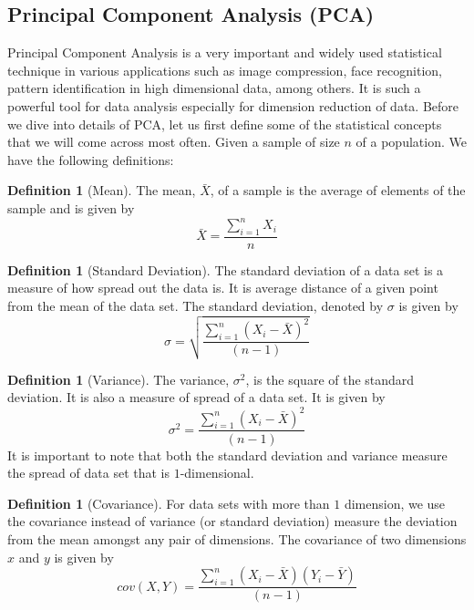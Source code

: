 \documentclass[10pt,a4paper]{article}
\theoremstyle{plain}
\theoremstyle{definition}
\newtheorem{defn}[subsection]{Definition}
\begin{document}
     \subsection{Principal Component Analysis (PCA)}
	  Principal Component Analysis is a very important and widely used statistical technique in various applications such as image compression, face recognition, pattern identification in high dimensional data, among others. It is such a powerful tool for data analysis especially for dimension reduction of data. Before we dive into details of PCA, let us first define some of the statistical concepts that we will come across most often. Given a sample of size $n$ of a population. We have the following definitions:
	  
	  \begin{defn}[Mean]
	  	The mean, $\bar{X}$, of a sample is the average of elements of the sample and is given by
	  	\begin{equation}
	  	\bar{X} = \frac{\sum_{i=1}^{n} X_i}{n}
	  	\end{equation}
	  \end{defn}
    
      \begin{defn}[Standard Deviation]
      	The standard deviation of a data set is a measure of how spread out the data is. It is average distance of a given point from the mean of the data set. The standard deviation, denoted by $\sigma$ is given by
      	\begin{equation}
      	\sigma = \sqrt{\frac{\sum_{i=1}^{n} (X_i - \bar{X})^2}{(n-1)}}
      	\end{equation}
      \end{defn}
  
      \begin{defn}[Variance]
      	The variance, $\sigma^2$, is the square of the standard deviation. It is also a measure of spread of a data set. It is given by
      	\begin{equation}
      	\sigma^2 =  \frac{\sum_{i=1}^{n} (X_i - \bar{X})^2}{(n-1)}
      	\end{equation}
      	It is important to note that both the standard deviation and variance measure the spread of data set that is $1$-dimensional. 
      \end{defn}
  
      \begin{defn}[Covariance]
      	For data sets with more than $1$ dimension, we use the covariance instead of variance (or standard deviation) measure the deviation from the mean amongst any pair of dimensions. The covariance of two dimensions $x$ and $y$ is given by
      	\begin{equation}
      	cov(X,Y) = \frac{\sum_{i=1}^{n} (X_i - \bar{X}) (Y_i - \bar{Y})}{(n-1)}
      	\end{equation}
      \end{defn}
  
\end{document}
